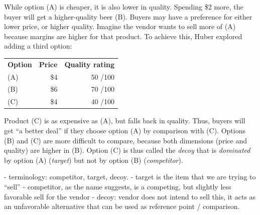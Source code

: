 While option (A) is cheaper, it is also lower in quality. Spending \$2 more, the buyer will get a higher-quality beer (B). Buyers may have a preference for either lower price, or higher quality. Imagine the vendor wants to sell more of (A) because margins are higher for that product. To achieve this, Huber \etal explored adding a third option:
\begin{table}[!h]
\begin{tabular}{lrr}
	\textbf{Option} & \textbf{Price} & \textbf{Quality rating}\\
	(A) & \$4 & 50 /100 \\
	(B) & \$6 & 70 /100\\
	(C) & \$4 & 40 /100 \\
\end{tabular} 

\end{table}
Product (C) is as expensive as (A), but falls back in quality. Thus, buyers will get ``a better deal'' if they choose option (A) by comparison with (C). Options (B) and (C) are more difficult to compare, because both dimensions (price and quality) are higher in (B). Option (C) is thus called the \textit{decoy} that is \textit{dominated} by option (A) (\textit{target}) but not by option (B) (\textit{competitor}). 

- terminology: competitor, target, decoy.
- target is the item that we are trying to ``sell'' 
- competitor, as the name suggests, is a competing, but slightly less favorable sell for the vendor
- decoy: vendor does not intend to sell this, it acts as an unfavorable alternative that can be used as reference point / comparison.\\	


